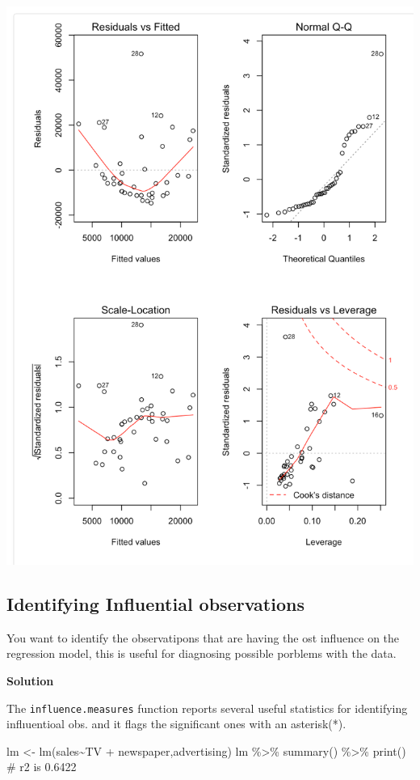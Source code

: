 \documentclass[
  letterpaper,
  DIV=11,
  numbers=noendperiod]{scrreprt}
\newenvironment{Shaded}{\begin{snugshade}}{\end{snugshade}}
\newcommand{\CommentTok}[1]{\textcolor[rgb]{0.41,0.41,0.41}{#1}}
\newcommand{\FunctionTok}[1]{\textcolor[rgb]{0.02,0.16,0.49}{#1}}
\newcommand{\NormalTok}[1]{\textcolor[rgb]{0.33,0.33,0.33}{#1}}
\newcommand{\OtherTok}[1]{\textcolor[rgb]{0.85,0.12,0.09}{#1}}
\newcommand{\SpecialCharTok}[1]{\textcolor[rgb]{0.00,0.46,0.62}{#1}}
\begin{document}
\includegraphics{rcook2.png}

\hypertarget{identifying-influential-observations}{%
\subsection{Identifying Influential
observations}\label{identifying-influential-observations}}

You want to identify the observatipons that are having the ost influence
on the regression model, this is useful for diagnosing possible porblems
with the data.

\textbf{Solution}

The \texttt{influence.measures} function reports several useful
statistics for identifying inflıuentioal obs. and it flags the
significant ones with an asterisk(*).

\begin{Shaded}
\begin{Highlighting}[]
\NormalTok{lm }\OtherTok{\textless{}{-}} \FunctionTok{lm}\NormalTok{(sales}\SpecialCharTok{\textasciitilde{}}\NormalTok{TV }\SpecialCharTok{+}\NormalTok{ newspaper,advertising)}
\NormalTok{lm }\SpecialCharTok{\%\textgreater{}\%} \FunctionTok{summary}\NormalTok{() }\SpecialCharTok{\%\textgreater{}\%} \FunctionTok{print}\NormalTok{() }\CommentTok{\# r2 is 0.6422}
\end{Highlighting}
\end{Shaded}
\end{document}
